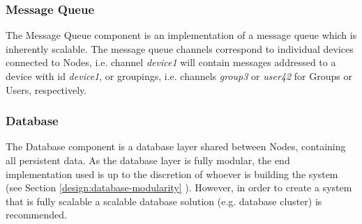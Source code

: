 \subsubsection{Message Queue}
The Message Queue component is an implementation of a message queue which is inherently scalable. The message queue channels correspond to individual devices connected to Nodes, i.e. channel \textit{device1} will contain messages addressed to a device with id \textit{device1}, or groupings, i.e. channels \textit{group3} or \textit{user42} for Groups or Users, respectively.

\subsubsection{Database}
The Database component is a database layer shared between Nodes, containing all persistent data. As the database layer is fully modular, the end implementation used is up to the discretion of whoever is building the system (see Section \ref{design:database-modularity} ). However, in order to create a system that is fully scalable a scalable database solution (e.g. database cluster) is recommended.